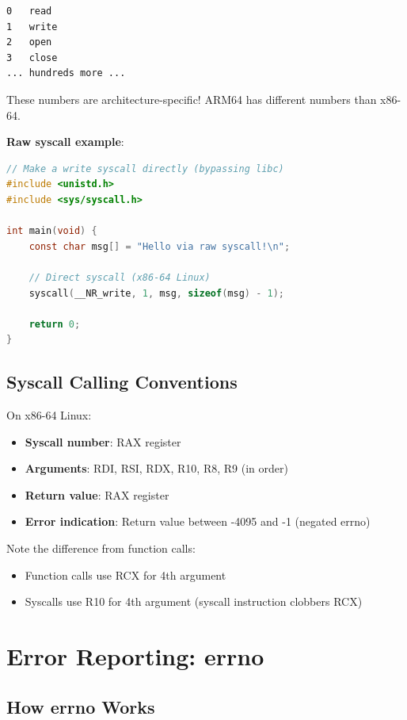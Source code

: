 \begin{verbatim}
0   read
1   write
2   open
3   close
... hundreds more ...
\end{verbatim}

These numbers are architecture-specific! ARM64 has different numbers than x86-64.

\textbf{Raw syscall example}:

\begin{lstlisting}[language=C]
// Make a write syscall directly (bypassing libc)
#include <unistd.h>
#include <sys/syscall.h>

int main(void) {
    const char msg[] = "Hello via raw syscall!\n";

    // Direct syscall (x86-64 Linux)
    syscall(__NR_write, 1, msg, sizeof(msg) - 1);

    return 0;
}
\end{lstlisting}

\subsection{Syscall Calling Conventions}

On x86-64 Linux:
\begin{itemize}
    \item \textbf{Syscall number}: RAX register
    \item \textbf{Arguments}: RDI, RSI, RDX, R10, R8, R9 (in order)
    \item \textbf{Return value}: RAX register
    \item \textbf{Error indication}: Return value between -4095 and -1 (negated errno)
\end{itemize}

Note the difference from function calls:
\begin{itemize}
    \item Function calls use RCX for 4th argument
    \item Syscalls use R10 for 4th argument (syscall instruction clobbers RCX)
\end{itemize}

\section{Error Reporting: errno}

\subsection{How errno Works}

